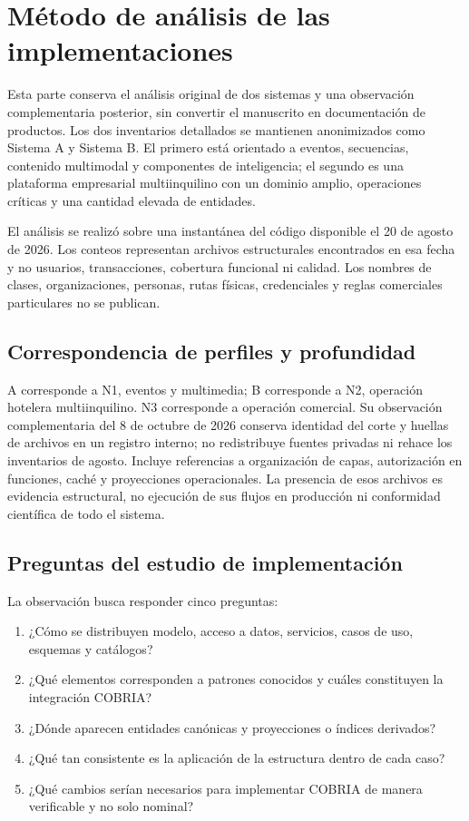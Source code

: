 \chapter{Método de análisis de las implementaciones}

Esta parte conserva el análisis original de dos sistemas y una observación
complementaria posterior, sin convertir el manuscrito en documentación de productos.
Los dos inventarios detallados se mantienen anonimizados
como Sistema A y Sistema B. El primero está orientado a eventos, secuencias, contenido
multimodal y componentes de inteligencia; el segundo es una plataforma empresarial
multiinquilino con un dominio amplio, operaciones críticas y una cantidad elevada de
entidades.

El análisis se realizó sobre una instantánea del código disponible el 20 de agosto de
2026. Los conteos representan archivos estructurales encontrados en esa fecha y no
usuarios, transacciones, cobertura funcional ni calidad. Los nombres de clases,
organizaciones, personas, rutas físicas, credenciales y reglas comerciales particulares
no se publican.

\section{Correspondencia de perfiles y profundidad}

\COBRIAPerfilesCientificos
A corresponde a N1, eventos y multimedia; B corresponde a N2, operación hotelera
multiinquilino. N3 corresponde a operación comercial. Su observación complementaria
del 8 de octubre de 2026 conserva identidad del corte y huellas de archivos en un
registro interno; no redistribuye fuentes privadas ni rehace los inventarios de agosto.
Incluye referencias a organización de capas, autorización en funciones, caché y
proyecciones operacionales. La presencia de esos archivos es evidencia estructural,
no ejecución de sus flujos en producción ni conformidad científica de todo el sistema.

\section{Preguntas del estudio de implementación}

La observación busca responder cinco preguntas:

\begin{enumerate}[leftmargin=*]
  \item ¿Cómo se distribuyen modelo, acceso a datos, servicios, casos de uso, esquemas y
  catálogos?
  \item ¿Qué elementos corresponden a patrones conocidos y cuáles constituyen la
  integración COBRIA?
  \item ¿Dónde aparecen entidades canónicas y proyecciones o índices derivados?
  \item ¿Qué tan consistente es la aplicación de la estructura dentro de cada caso?
  \item ¿Qué cambios serían necesarios para implementar COBRIA de manera verificable y
  no solo nominal?
\end{enumerate}

